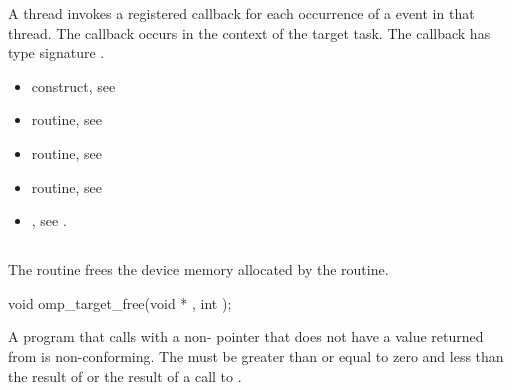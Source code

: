 \begin{ccppspecific}
\tools

A thread invokes a registered 
callback for each occurrence of a  event in that thread. 
The callback occurs in the context of the target task.  The callback has type signature
. 


\crossreferences
\begin{itemize}
\item {} construct, see 

\item {} routine, see 

\item {} routine, see 

\item {} routine, see 

\item {}, see 
.

\end{itemize}



\subsection{}
\label{subsec:omp_target_free}
\summary
The  routine frees the device memory allocated by the  routine.

\format
\begin{boxedcode}
void omp\_target\_free(void * , int );
\end{boxedcode}

\constraints

A program that calls  with a non- pointer 
that does not have a value returned from  is
non-conforming.  The  must be greater than or equal to 
zero and less than the result of  or the
 result of a call to .

\pagebreak
{}
\effect


\end{ccppspecific}
